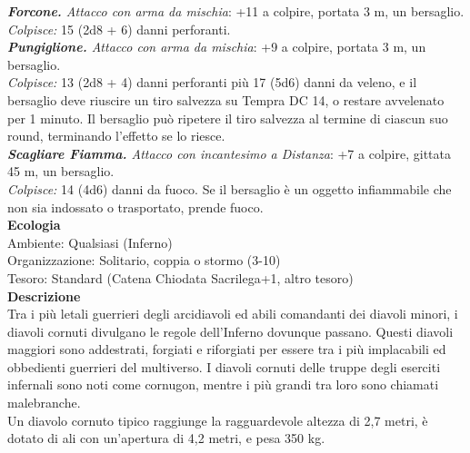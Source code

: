 \begin{multicols}{2}
\emph{\textbf{Forcone.} Attacco con arma da mischia}: +11 a colpire, portata 3 m, un bersaglio.\\
\emph{Colpisce:} 15 (2d8 + 6) danni perforanti.\\
\emph{\textbf{Pungiglione.} Attacco con arma da mischia}: +9 a colpire, portata 3 m, un bersaglio.\\
\emph{Colpisce:} 13 (2d8 + 4) danni perforanti più 17 (5d6) danni da veleno, e il bersaglio deve riuscire un tiro salvezza su Tempra DC 14, o restare avvelenato per 1 minuto. Il bersaglio può ripetere il tiro salvezza al termine di ciascun suo round, terminando l'effetto se lo riesce.\\
\emph{\textbf{Scagliare Fiamma.} Attacco con incantesimo a Distanza}: +7 a colpire, gittata 45 m, un bersaglio.\\
\emph{Colpisce:} 14 (4d6) danni da fuoco. Se il bersaglio è un oggetto infiammabile che non sia indossato o trasportato, prende fuoco.\\
\textbf{Ecologia}\\
Ambiente: Qualsiasi (Inferno)\\
Organizzazione: Solitario, coppia o stormo (3-10)\\
Tesoro: Standard (Catena Chiodata Sacrilega+1, altro tesoro)\\
\textbf{Descrizione}\\
Tra i più letali guerrieri degli arcidiavoli ed abili comandanti dei diavoli minori, i diavoli cornuti divulgano le regole dell’Inferno dovunque passano. Questi diavoli maggiori sono addestrati, forgiati e riforgiati per essere tra i più implacabili ed obbedienti guerrieri del multiverso. I diavoli cornuti delle truppe degli eserciti infernali sono noti come cornugon, mentre i più grandi tra loro sono chiamati malebranche.\\
Un diavolo cornuto tipico raggiunge la ragguardevole altezza di 2,7 metri, è dotato di ali con un’apertura di 4,2 metri, e pesa 350 kg.\\


\end{multicols}
